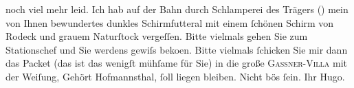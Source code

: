                noch viel mehr leid. Ich hab auf der Bahn durch Schlamperei des Trägers () mein von Ihnen bewundertes dunkles Schirmfutteral mit einem {\pb}ſchönen Schirm von Rodeck und grauem Naturſtock vergeſſen. Bitte
               vielmals gehen Sie zum Stationschef und Sie werdens gewiſs beko{\geminationm}en.
               Bitte vielmals{ }ſchicken Sie mir dann das Packet (das ist das wenigſt mühſame für Sie)
                  {\pb}in die große \textsc{Gassner-Villa} mit der Weiſung, Gehört Hofmannsthal,{ }ſoll liegen bleiben.\pend
           \pstart Nicht bös{ }ſein. Ihr \spacefill\mbox{Hugo.}\pend{}\endnumbering{}  \newcommand{\dateiname}{L00969}\newcommand{\titel}{Hugo von Hofmannsthal an Arthur Schnitzler, [8. 9. 1899]}\newcommand{\editorInnen}{Martin Anton Müller und Gerd-Hermann Susen}

